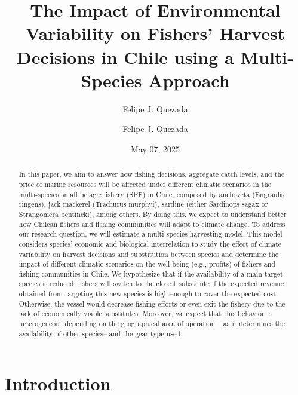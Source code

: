 \documentclass[
  11pt,
]{article}
\author{Felipe J. Quezada}
\affil{Department of Economics \\ University of Concepción \vspace{-48pt}}
\title{The Impact of Environmental Variability on Fishers' Harvest
Decisions in Chile using a Multi-Species Approach}
\author{Felipe J. Quezada}
\date{May 07, 2025}
\begin{document}
\maketitle
\begin{abstract}
In this paper, we aim to answer how fishing decisions, aggregate catch
levels, and the price of marine resources will be affected under
different climatic scenarios in the multi-species small pelagic fishery
(SPF) in Chile, composed by anchoveta (Engraulis ringens), jack mackerel
(Trachurus murphyi), sardine (either Sardinops sagax or Strangomera
bentincki), among others. By doing this, we expect to understand better
how Chilean fishers and fishing communities will adapt to climate
change. To address our research question, we will estimate a
multi-species harvesting model. This model considers species' economic
and biological interrelation to study the effect of climate variability
on harvest decisions and substitution between species and determine the
impact of different climatic scenarios on the well-being (e.g., profits)
of fishers and fishing communities in Chile. We hypothesize that if the
availability of a main target species is reduced, fishers will switch to
the closest substitute if the expected revenue obtained from targeting
this new species is high enough to cover the expected cost. Otherwise,
the vessel would decrease fishing efforts or even exit the fishery due
to the lack of economically viable substitutes. Moreover, we expect that
this behavior is heterogeneous depending on the geographical area of
operation -- as it determines the availability of other species-- and
the gear type used.
\end{abstract}

\section{Introduction}\label{introduction}
\end{document}
